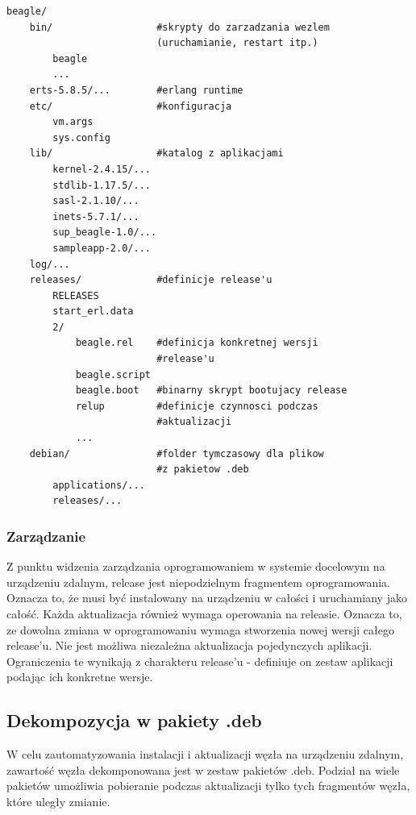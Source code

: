 \documentclass[polish,12pt]{aghthesis}
\begin{document}
\begin{verbatim}
beagle/
    bin/                  #skrypty do zarzadzania wezlem
                          (uruchamianie, restart itp.)
        beagle
        ...
    erts-5.8.5/...        #erlang runtime
    etc/                  #konfiguracja
        vm.args
        sys.config
    lib/                  #katalog z aplikacjami
        kernel-2.4.15/...
        stdlib-1.17.5/...
        sasl-2.1.10/...
        inets-5.7.1/...
        sup_beagle-1.0/...
        sampleapp-2.0/...
    log/...
    releases/             #definicje release'u
        RELEASES
        start_erl.data
        2/
            beagle.rel    #definicja konkretnej wersji
                          #release'u
            beagle.script
            beagle.boot   #binarny skrypt bootujacy release
            relup         #definicje czynnosci podczas
                          #aktualizacji
            ...
    debian/               #folder tymczasowy dla plikow
                          #z pakietow .deb
        applications/...
        releases/...
\end{verbatim}

\subsubsection{Zarządzanie}

Z punktu widzenia zarządzania oprogramowaniem w systemie docelowym na urządzeniu zdalnym, release jest niepodzielnym fragmentem oprogramowania. Oznacza to, że musi być instalowany na urządzeniu w całości i uruchamiany jako całość. Każda aktualizacja również wymaga operowania na releasie. Oznacza to, ze dowolna zmiana w oprogramowaniu wymaga stworzenia nowej wersji całego release'u. Nie jest możliwa niezależna aktualizacja pojedynczych aplikacji. Ograniczenia te wynikają z charakteru release'u - definiuje on zestaw aplikacji podając ich konkretne wersje.

\subsection{Dekompozycja w pakiety .deb}

W celu zautomatyzowania instalacji i aktualizacji węzła na urządzeniu zdalnym, zawartość węzła dekomponowana jest w zestaw pakietów .deb. Podział na wiele pakietów umożliwia pobieranie podczas aktualizacji tylko tych fragmentów węzła, które uległy zmianie.
\end{document}
